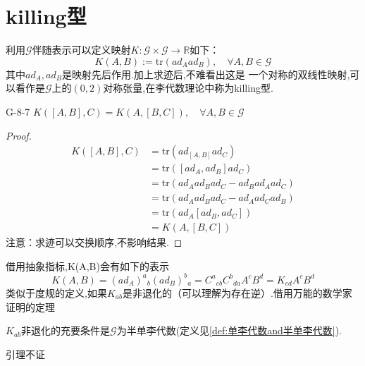 \documentclass[../main.tex]{subfiles}
\begin{document}
\section{killing型}
利用$\mathscr{G}$伴随表示可以定义映射$K:\mathscr{G}\times \mathscr{G} \rightarrow \mathbb{R}$如下：
$$
	K(A,B):= \text{tr}(ad_A ad_B),\quad \forall A,B \in \mathscr{G}$$ 其中$ad_A,ad_B$是映射先后作用.加上求迹后,不难看出这是
一个对称的双线性映射,可以看作是$\mathscr{G}$上的$(0,2)$对称张量,在李代数理论中称为killing型.
\begin{theorem}{}{G-8-7}
	$K([A,B],C) = K(A,[B,C]),\quad \forall A,B \in \mathscr{G}$
\end{theorem}
\begin{proof}
	\begin{align*}
		K([A,B],C) & = \text{tr}(ad_{[A,B]}ad_C)                  \\
		           & = \text{tr}([ad_A,ad_B]ad_C)                 \\
		           & = \text{tr}(ad_A ad_B ad_C - ad_B ad_A ad_C) \\
		           & = \text{tr}(ad_A ad_B ad_C - ad_A ad_C ad_B) \\
		           & = \text{tr}(ad_A[ad_B,ad_C])                 \\
		           & = K(A,[B,C])
	\end{align*}
	注意：求迹可以交换顺序,不影响结果.
\end{proof}
借用抽象指标,K(A,B)会有如下的表示$$
	K(A,B) = (ad_A)^a{}_b(ad_B)^b{}_a = C^a{}_{cb} C^b{}_{da}A^cB^d = K_{cd} A^cB^d$$
类似于度规的定义,如果$K_{ab}$是非退化的（可以理解为存在逆）.借用万能的数学家证明的定理
\begin{lemma}
	$K_{ab}$非退化的充要条件是$\mathscr{G}$为半单李代数(定义见\ref{def:单李代数and半单李代数}).
\end{lemma}
引理不证
\end{document}
